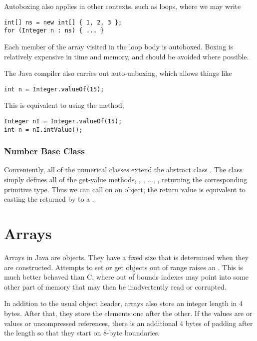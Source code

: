 Autoboxing also applies in other contexts, such as loops, where
we may write
%
\begin{verbatim}
int[] ns = new int[] { 1, 2, 3 };
for (Integer n : ns) { ... }
\end{verbatim}
%
Each member of the array visited in the loop body is autoboxed.
Boxing is relatively expensive in time and memory, and should be
avoided where possible.

The Java compiler also carries out auto-unboxing, which allows things like
%
\begin{verbatim}
int n = Integer.valueOf(15);
\end{verbatim}
%
This is equivalent to using the  method,
%
\begin{verbatim}
Integer nI = Integer.valueOf(15);
int n = nI.intValue();
\end{verbatim}


\subsubsection{Number Base Class}

Conveniently, all of the numerical classes extend the abstract class
.  The class  simply defines all of the
get-value methods, , , ...,
, returning the corresponding primitive type.
Thus we can call  on an  object; the
return value is equivalent to casting the  returned by
 to a .



\section{Arrays}

Arrays in Java are objects.  They have a fixed size that is determined
when they are constructed.  Attempts to set or get objects out of
range raises an .  This is much better
behaved than C, where out of bounds indexes may point into some other
part of memory that may then be inadvertently read or corrupted.

In addition to the usual object header, arrays also store an integer
length in 4 bytes.  After that, they store the elements one after the
other.  If the values are  or  values or
uncompressed references, there is an additional 4 bytes of padding
after the length so that they start on 8-byte boundaries.


